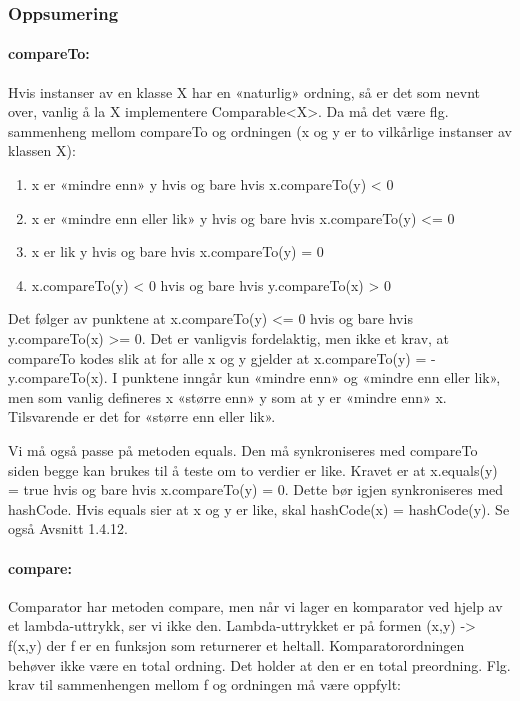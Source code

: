 \documentclass[11pt]{article}
\begin{document}
\newpage

        \subsubsection{Oppsumering}
            \paragraph{compareTo:} Hvis instanser av en klasse X har en «naturlig» ordning, så er det som nevnt
            over, vanlig å la X implementere Comparable<X>. Da må det være flg. sammenheng mellom
            compareTo og ordningen (x og y er to vilkårlige instanser av klassen X): 

            \begin{enumerate}
                \item x er «mindre enn» y hvis og bare hvis x.compareTo(y) < 0
                \item x er «mindre enn eller lik» y hvis og bare hvis x.compareTo(y) <= 0
                \item x er lik y hvis og bare hvis x.compareTo(y) = 0
                \item x.compareTo(y) < 0 hvis og bare hvis y.compareTo(x) > 0
            \end{enumerate}

            Det følger av punktene at x.compareTo(y) <= 0 hvis og bare hvis y.compareTo(x) >= 0. Det
            er vanligvis fordelaktig, men ikke et krav, at compareTo kodes slik at for alle x og y gjelder at
            x.compareTo(y) = -y.compareTo(x). I punktene inngår kun «mindre enn» og «mindre enn
            eller lik», men som vanlig defineres x «større enn» y som at y er «mindre enn» x. Tilsvarende
            er det for «større enn eller lik».

            Vi må også passe på metoden equals. Den må synkroniseres med compareTo siden begge
            kan brukes til å teste om to verdier er like. Kravet er at x.equals(y) = true hvis og bare
            hvis x.compareTo(y) = 0. Dette bør igjen synkroniseres med hashCode. Hvis equals sier at x
            og y er like, skal hashCode(x) = hashCode(y). Se også Avsnitt 1.4.12.

            \paragraph{compare:} Comparator har metoden compare, men når vi lager en komparator ved hjelp av
            et lambda-uttrykk, ser vi ikke den. Lambda-uttrykket er på formen (x,y) -> f(x,y) der f er
            en funksjon som returnerer et heltall. Komparatorordningen behøver ikke være en total
            ordning. Det holder at den er en total preordning. Flg. krav til sammenhengen mellom f
            og ordningen må være oppfylt:
\end{document}
